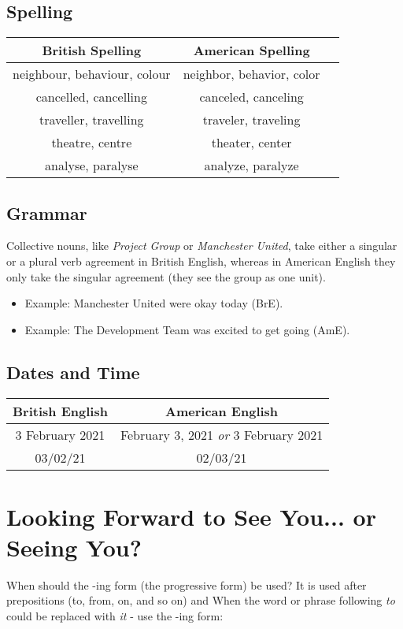 \documentclass{article}
\begin{document}
\subsection{Spelling}
\begin{tabular}{c|c|c}
    British Spelling & American Spelling \\
    \hline
    neighbour, behaviour, colour & neighbor, behavior, color \\
    cancelled, cancelling & canceled, canceling \\
    traveller, travelling & traveler, traveling \\
    theatre, centre & theater, center \\
    analyse, paralyse & analyze, paralyze \\

\end{tabular}


\subsection{Grammar}

    Collective nouns, like \textit{Project Group} or \textit{Manchester United}, take either a singular or a plural verb agreement in British English, whereas in American English they only take the singular agreement (they see the group as one unit). 
    
\begin{itemize}
    \item Example: Manchester United were okay today (BrE). 
     \item Example: The Development Team was excited to get going (AmE).
\end{itemize}

\subsection{Dates and Time}

\begin{tabular}{c|c}
    British English & American English \\
    \hline
    3 February 2021 & February 3, 2021 \textit{or} 3 February 2021 \\
    03/02/21 & 02/03/21 \\
\end{tabular}


\section{Looking Forward to See You... or Seeing You?}
When should the -ing form (the progressive form) be used? It is used after prepositions (to, from, on, and so on) and 
When the word or phrase following \textit{to} could be replaced with \textit{it} - use the -ing form:
\end{document}
